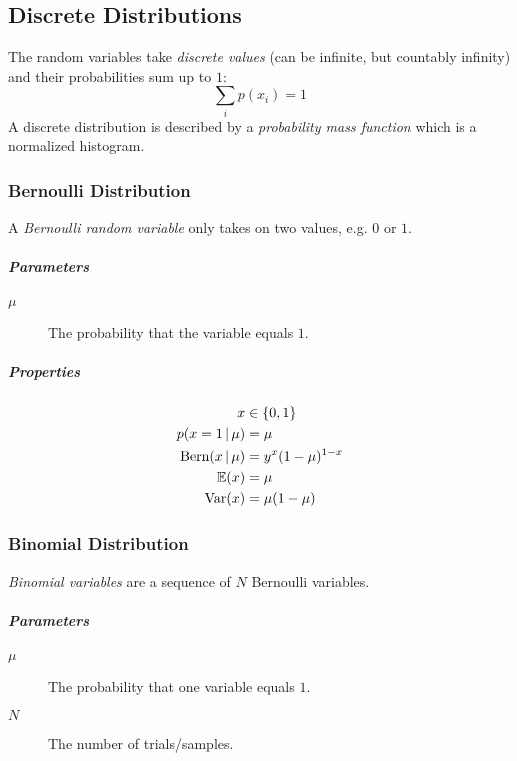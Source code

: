 		\subsection{Discrete Distributions}
			The random variables take \emph{discrete values} (can be infinite, but countably infinity) and their probabilities sum up to \(1\):
			\begin{equation}
				\sum_i p(x_i) = 1
			\end{equation}
			A discrete distribution is described by a \emph{probability mass function} which is a normalized histogram.

			\subsubsection{Bernoulli Distribution}
				A \emph{Bernoulli random variable} only takes on two values, e.g. \(0\) or \(1\).

				\subparagraph{Parameters}
				\begin{description}
					\item[\(\mu\)] The probability that the variable equals \(1\).
				\end{description}

				\subparagraph{Properties}
				\begin{align}
					x                           & \in \{ 0, 1 \}        \\
					p(x = 1 \,\vert\, \mu)         & = \mu                 \\
					\textrm{Bern}(x \,\vert\, \mu) & = y^x (1 - \mu)^{1-x} \\
					\mathbb{E}(x)                       & = \mu                 \\
					\operatorname{Var}(x)                     & = \mu(1 - \mu)
				\end{align}

			\subsubsection{Binomial Distribution}
				\emph{Binomial variables} are a sequence of \(N\) Bernoulli variables.

				\subparagraph{Parameters}
				\begin{description}
					\item [\(\mu\)] The probability that one variable equals \(1\).
					\item [\(N\)] The number of trials/samples.
				\end{description}

